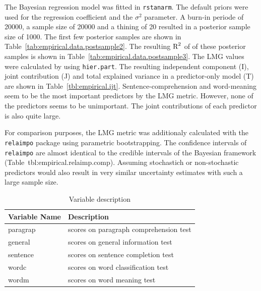 \documentclass[11pt,a4paper,twoside]{book}\usepackage[]{graphicx}\usepackage[]{color}
\begin{document}
The Bayesian regression model was fitted in \texttt{rstanarm}. The default priors were used for the regression coefficient and the $\sigma^2$ parameter.   A burn-in periode of 20000, a sample size of 20000 and a thining of 20 resulted in a posterior sample size of 1000. The first few posterior samples are shown in Table~\ref{tab:empirical.data.postsample2}. The resulting $\text{R}^2$ of of these posterior samples is shown in Table~\ref{tab:empirical.data.postsample3}. The LMG values were calculated by using \texttt{hier.part}. The resulting independent component (I), joint contribution (J) and total explained variance in a predictor-only model (T) are shown in Table~\ref{tbl:empirical.ijt}. Sentence-comprehension and word-meaning seem to be the most important predictors by the LMG metric. However, none of the predictors seems to be unimportant.  The joint contributions of each predictor is also quite large.

For comparison purposes, the LMG metric was additionaly calculated with the \texttt{relaimpo} package using parametric bootstrapping. The confidence intervals of  \texttt{relaimpo} are almost identical to the credible intervals of the Bayesian framework (Table~tbl:empirical.relaimp.comp). Assuming stochastich or non-stochastic predictors would also result in very similar uncertainty estimates with such a large sample size. 







\begin{table}
\centering
\caption{Variable description}
\begin{tabular}{l l}
  \toprule			
  Variable Name & Description  \\   \midrule  
  paragrap & scores on paragraph comprehension test  \\
  general & scores on general information test \\
  sentence & scores on sentence completion test\\
  wordc & scores on word classification test \\
  wordm & scores on word meaning test \\
  \bottomrule  
\end{tabular}
\label{table:hs.data}
\end{table}
\end{document}
